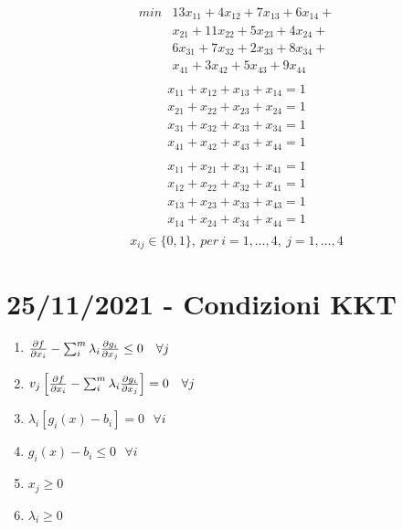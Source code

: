 \documentclass[12pt,a4paper]{article}
\begin{document}
\begin{equation*}
\begin{array}{rl}
min & 13x_{11} + 4x_{12} + 7x_{13}+6x_{14}+\\
&x_{21} + 11x_{22} + 5x_{23}+4x_{24} +\\
&6x_{31} + 7x_{32} + 2x_{33}+8x_{34}+\\
&x_{41} + 3x_{42} + 5x_{43}+9x_{44}\\
\end{array}
\end{equation*}
\SmallSep
\begin{equation*}
\begin{array}{l}
x_{11} + x_{12} + x_{13} + x_{14} = 1\\
x_{21} + x_{22} + x_{23} + x_{24} = 1\\
x_{31} + x_{32} + x_{33} + x_{34} = 1\\
x_{41} + x_{42} + x_{43} + x_{44} = 1\\
\end{array}
\end{equation*}
\SmallSep
\begin{equation*}
\begin{array}{l}
x_{11} + x_{21} + x_{31} + x_{41} = 1\\
x_{12} + x_{22} + x_{32} + x_{41} = 1\\
x_{13} + x_{23} + x_{33} + x_{43} = 1\\
x_{14} + x_{24} + x_{34} + x_{44} = 1\\
\end{array}
\end{equation*}
$$x_{ij} \in \{0,1\}, \ per\ i=1,\dots, 4, \ j=1,\dots,4$$

\clearpage
\section{25/11/2021 - Condizioni KKT}
\begin{enumerate}
\item ${\partial f \over \partial x_i} - \sum_{i}^m\lambda_i {\partial g_i \over \partial x_j} \leq 0 \ \ \ \forall j$
\item $v_j \left[{\partial f \over \partial x_i} - \sum_{i}^m\lambda_i {\partial g_i \over \partial x_j}\right] = 0 \ \ \ \forall j$
\item $\lambda_i \left[g_i(x) - b_i\right] = 0 \ \ \ \forall i$
\item $g_i(x) - b_i \leq 0 \ \ \ \forall i$
\item $x_j \geq 0$
\item $\lambda_i \geq 0$
\end{enumerate}
\end{document}

